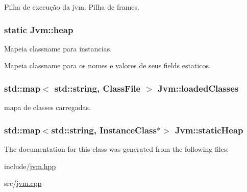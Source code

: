 Pilha de execução da jvm. Pilha de frames. 

\hypertarget{classJvm_a8e1cdfdf727e1b674a033fbd17337f38}{
\subsubsection[{heap}]{\setlength{\rightskip}{0pt plus 5cm}static Jvm\+::heap}}\label{classJvm_a8e1cdfdf727e1b674a033fbd17337f38}


Mapeia classname para instancias. 

Mapeia classname para os nomes e valores de seus fields estaticos. \hypertarget{classJvm_ac74fb0e170f232ddc32244a1ce7746b7}{
\subsubsection[{loaded\+Classes}]{\setlength{\rightskip}{0pt plus 5cm}std\+::map$<$ std\+::string, {\bf Class\+File} $>$ Jvm\+::loaded\+Classes}}\label{classJvm_ac74fb0e170f232ddc32244a1ce7746b7}


mapa de classes carregadas. 

\hypertarget{classJvm_a8852d50533c03dabd4320c27e92d4f1b}{
\subsubsection[{static\+Heap}]{\setlength{\rightskip}{0pt plus 5cm}std\+::map$<$std\+::string, {\bf Instance\+Class}$\ast$$>$ Jvm\+::static\+Heap}}\label{classJvm_a8852d50533c03dabd4320c27e92d4f1b}


The documentation for this class was generated from the following files\+:\begin{DoxyCompactItemize}
\item 
include/\hyperlink{jvm_8hpp}{jvm.\+hpp}\item 
src/\hyperlink{jvm_8cpp}{jvm.\+cpp}\end{DoxyCompactItemize}
